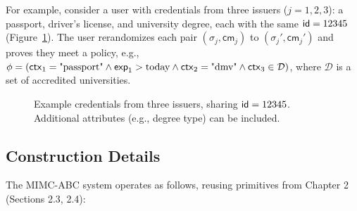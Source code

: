 For example, consider a user with credentials from three issuers ($j = 1, 2, 3$): a passport, driver’s license, and university degree, each with the same $\mathsf{id} = 12345$ (Figure~\ref{fig:three-creds}). The user rerandomizes each pair $(\sigma_j, \mathsf{cm}_j)$ to $(\sigma_j', \mathsf{cm}_j')$ and proves they meet a policy, e.g., $\phi = (\mathsf{ctx}_1 = \text{"passport"} \land \mathsf{exp}_1 > \text{today} \land \mathsf{ctx}_2 = \text{"dmv"} \land \mathsf{ctx}_3 \in \mathcal{D})$, where $\mathcal{D}$ is a set of accredited universities.

\begin{figure}[h]
    \centering
    \begin{pchstack}[boxed, center, space=4em]
        \begin{pcvstack}
        \end{pcvstack}
        \pcvspace
        \begin{pcvstack}
        \end{pcvstack}
        \pcvspace
        \begin{pcvstack}
        \end{pcvstack}
    \end{pchstack}
    \caption{Example credentials from three issuers, sharing $\mathsf{id} = 12345$. Additional attributes (e.g., degree type) can be included.}
    \label{fig:three-creds}
\end{figure}

\subsection{Construction Details}

The MIMC-ABC system operates as follows, reusing primitives from Chapter 2 (Sections 2.3, 2.4):

